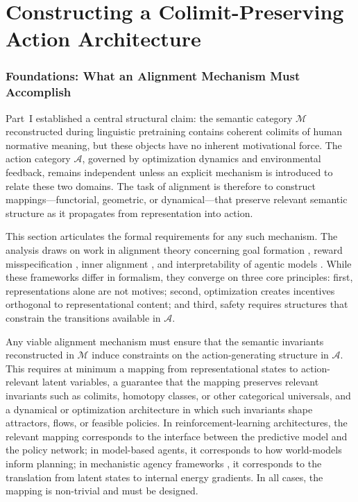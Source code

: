 \documentclass[12pt]{article}
\theoremstyle{definition}
\begin{document}

\part{Constructing a Colimit-Preserving Action Architecture}

\section{Foundations: What an Alignment Mechanism Must Accomplish}

Part~I established a central structural claim: the semantic category
$\mathcal{M}$ reconstructed during linguistic pretraining contains coherent
colimits of human normative meaning, but these objects have no inherent
motivational force. The action category $\mathcal{A}$, governed by optimization
dynamics and environmental feedback, remains independent unless an explicit
mechanism is introduced to relate these two domains. The task of alignment is
therefore to construct mappings---functorial, geometric, or dynamical---that
preserve relevant semantic structure as it propagates from representation into
action.

This section articulates the formal requirements for any such mechanism. The
analysis draws on work in alignment theory concerning goal formation
\citep{bostrom2012superintelligent,omohundro2008basic}, reward misspecification
\citep{krakovna2020}, inner alignment \citep{hubinger2019risks}, and
interpretability of agentic models \citep{olah2020,elhage2022}. While these
frameworks differ in formalism, they converge on three core principles: first,
representations alone are not motives; second, optimization creates incentives
orthogonal to representational content; and third, safety requires structures
that constrain the transitions available in $\mathcal{A}$.

Any viable alignment mechanism must ensure that the semantic invariants
reconstructed in $\mathcal{M}$ induce constraints on the action-generating
structure in $\mathcal{A}$. This requires at minimum a mapping from
representational states to action-relevant latent variables, a guarantee that
the mapping preserves relevant invariants such as colimits, homotopy classes,
or other categorical universals, and a dynamical or optimization architecture
in which such invariants shape attractors, flows, or feasible policies. In
reinforcement-learning architectures, the relevant mapping corresponds to the
interface between the predictive model and the policy network; in model-based
agents, it corresponds to how world-models inform planning; in mechanistic
agency frameworks \citep{everitt2021,lecun2022}, it corresponds to the
translation from latent states to internal energy gradients. In all cases, the
mapping is non-trivial and must be designed.
\end{document}
